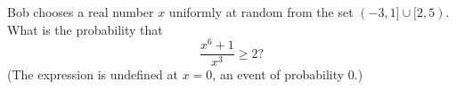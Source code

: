Bob chooses a real number $x$ uniformly at random from the set $(-3,1]\cup[2,5)$. What is the probability that
\[\dfrac{x^6+1}{x^3}\ge2?\]
(The expression is undefined at $x=0$, an event of probability $0$.)
